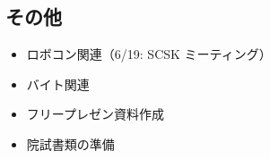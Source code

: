 \documentclass[uplatex, onecolumn, 10pt]{jsarticle}
\begin{document}
\subsection*{その他}
\begin{itemize}
	\item ロボコン関連（6/19: SCSK ミーティング）
    \item バイト関連
    \item フリープレゼン資料作成
    \item 院試書類の準備
\end{itemize}
\end{document}
